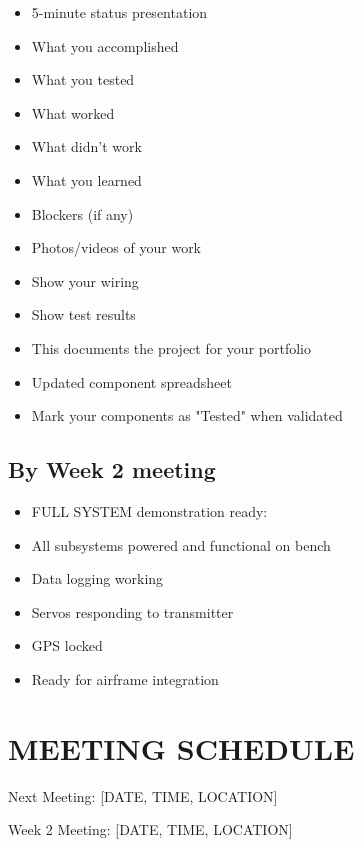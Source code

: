 \documentclass[11pt,letterpaper]{article}
\begin{document}
{\begin{itemize}
  \item 5-minute status presentation
  \item What you accomplished
  \item What you tested
  \item What worked
  \item What didn't work
  \item What you learned
  \item Blockers (if any)
\end{itemize}

\begin{itemize}
  \item Photos/videos of your work
  \item Show your wiring
  \item Show test results
  \item This documents the project for your portfolio
\end{itemize}

\begin{itemize}
  \item Updated component spreadsheet
  \item Mark your components as "Tested" when validated
\end{itemize}

\subsection{By Week 2 meeting}

\begin{itemize}
  \item FULL SYSTEM demonstration ready:
  \item All subsystems powered and functional on bench
  \item Data logging working
  \item Servos responding to transmitter
  \item GPS locked
  \item Ready for airframe integration
\end{itemize}

\section{MEETING SCHEDULE}

Next Meeting: [DATE, TIME, LOCATION]\par

Week 2 Meeting: [DATE, TIME, LOCATION]\par

}
\end{document}
